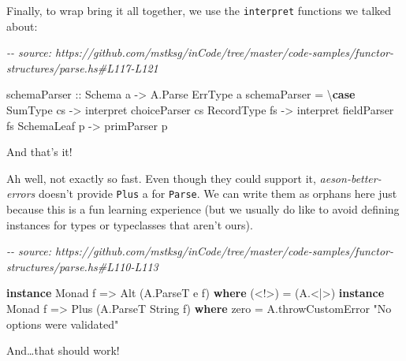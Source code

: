 \documentclass[]{article}
\newenvironment{Shaded}{}{}
\newcommand{\CommentTok}[1]{\textcolor[rgb]{0.38,0.63,0.69}{\textit{#1}}}
\newcommand{\DataTypeTok}[1]{\textcolor[rgb]{0.56,0.13,0.00}{#1}}
\newcommand{\KeywordTok}[1]{\textcolor[rgb]{0.00,0.44,0.13}{\textbf{#1}}}
\newcommand{\NormalTok}[1]{#1}
\newcommand{\OperatorTok}[1]{\textcolor[rgb]{0.40,0.40,0.40}{#1}}
\newcommand{\OtherTok}[1]{\textcolor[rgb]{0.00,0.44,0.13}{#1}}
\newcommand{\StringTok}[1]{\textcolor[rgb]{0.25,0.44,0.63}{#1}}
\begin{document}
Finally, to wrap bring it all together, we use the \texttt{interpret} functions
we talked about:

\begin{Shaded}
\begin{Highlighting}[]
\CommentTok{{-}{-} source: https://github.com/mstksg/inCode/tree/master/code{-}samples/functor{-}structures/parse.hs\#L117{-}L121}

\OtherTok{schemaParser ::} \DataTypeTok{Schema}\NormalTok{ a }\OtherTok{{-}>} \DataTypeTok{A.Parse} \DataTypeTok{ErrType}\NormalTok{ a}
\NormalTok{schemaParser }\OtherTok{=}\NormalTok{ \textbackslash{}}\KeywordTok{case}
    \DataTypeTok{SumType}\NormalTok{    cs }\OtherTok{{-}>}\NormalTok{ interpret choiceParser cs}
    \DataTypeTok{RecordType}\NormalTok{ fs }\OtherTok{{-}>}\NormalTok{ interpret fieldParser fs}
    \DataTypeTok{SchemaLeaf}\NormalTok{ p  }\OtherTok{{-}>}\NormalTok{ primParser p}
\end{Highlighting}
\end{Shaded}

And that's it!

Ah well, not exactly so fast. Even though they could support it,
\emph{aeson-better-errors} doesn't provide \texttt{Plus} a for \texttt{Parse}.
We can write them as orphans here just because this is a fun learning experience
(but we usually do like to avoid defining instances for types or typeclasses
that aren't ours).

\begin{Shaded}
\begin{Highlighting}[]
\CommentTok{{-}{-} source: https://github.com/mstksg/inCode/tree/master/code{-}samples/functor{-}structures/parse.hs\#L110{-}L113}

\KeywordTok{instance} \DataTypeTok{Monad}\NormalTok{ f }\OtherTok{=>} \DataTypeTok{Alt}\NormalTok{ (}\DataTypeTok{A.ParseT}\NormalTok{ e f) }\KeywordTok{where}
\NormalTok{    (}\OperatorTok{<!>}\NormalTok{) }\OtherTok{=}\NormalTok{ (}\OperatorTok{A.<|>}\NormalTok{)}
\KeywordTok{instance} \DataTypeTok{Monad}\NormalTok{ f }\OtherTok{=>} \DataTypeTok{Plus}\NormalTok{ (}\DataTypeTok{A.ParseT} \DataTypeTok{String}\NormalTok{ f) }\KeywordTok{where}
\NormalTok{    zero  }\OtherTok{=}\NormalTok{ A.throwCustomError }\StringTok{"No options were validated"}
\end{Highlighting}
\end{Shaded}

And\ldots that should work!
\end{document}

